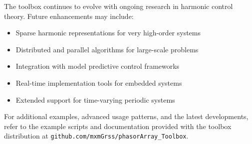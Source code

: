 \documentclass[11pt,a4paper]{article}
\begin{document}
The toolbox continues to evolve with ongoing research in harmonic control theory. Future enhancements may include:

\begin{itemize}
    \item Sparse harmonic representations for very high-order systems
    \item Distributed and parallel algorithms for large-scale problems
    \item Integration with model predictive control frameworks
    \item Real-time implementation tools for embedded systems
    \item Extended support for time-varying periodic systems
\end{itemize}

For additional examples, advanced usage patterns, and the latest developments, refer to the example scripts and documentation provided with the toolbox distribution at \texttt{github.com/mxmGrss/phasorArray\_Toolbox}.
\end{document}
